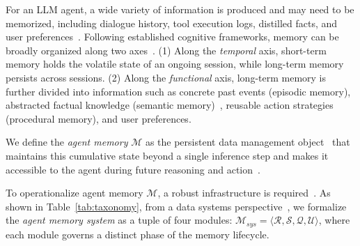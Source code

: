  For an LLM agent, a wide variety of information is produced and may need to be memorized, including dialogue history, tool execution logs, distilled facts, and user preferences~\cite{zhang2024survey}. Following established cognitive frameworks, memory can be broadly organized along two axes~\cite{hu2025memory, tang2026survey}. 
(1) Along the \emph{temporal} axis, {short-term memory} holds the volatile state of an ongoing session, while {long-term memory} persists across sessions. 
(2) Along the \emph{functional} axis, long-term memory is further divided into information such as concrete past events (episodic memory), abstracted factual knowledge (semantic memory)~\cite{hu2025memory, wu2026memoryeab}, reusable action strategies (procedural memory), and user preferences.


 We define the \emph{agent memory} $\mathcal{M}$ as the persistent data management object~\cite{packer2023memgpt, wu2026memoryeab} that maintains this cumulative state beyond a single inference step and makes it accessible to the agent during future reasoning and action~\cite{zhang2024survey, hu2025memory}.





 To operationalize agent memory $\mathcal{M}$, a robust infrastructure is required~\cite{packer2023memgpt, hu2025memory}. 
As shown in Table~\ref{tab:taxonomy}, from a data systems perspective~\cite{wu2026memoryeab, llm4db}, we formalize the \emph{agent memory system} as a tuple of four modules: $\mathcal{M}_{sys} = \langle \mathcal{R}, \mathcal{S}, \mathcal{Q}, \mathcal{U} \rangle$, where each module governs a distinct phase of the memory lifecycle.


